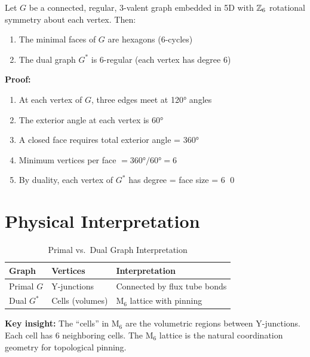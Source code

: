 \begin{derivationbox}[title=Formal Theorem (M$_6$ Coordination)]
    Let $G$ be a connected, regular, 3-valent graph embedded in 5D with $\mathbb{Z}_6$
    rotational symmetry about each vertex. Then:
    \begin{enumerate}
        \item The minimal faces of $G$ are hexagons (6-cycles)
        \item The dual graph $G^*$ is 6-regular (each vertex has degree 6)
    \end{enumerate}

    \textbf{Proof:}
    \begin{enumerate}
        \item At each vertex of $G$, three edges meet at 120° angles
        \item The exterior angle at each vertex is 60°
        \item A closed face requires total exterior angle = 360°
        \item Minimum vertices per face $= 360°/60° = 6$
        \item By duality, each vertex of $G^*$ has degree = face size = 6 \qed
    \end{enumerate}
    \tagDer
\end{derivationbox}

\section{Physical Interpretation}
\label{sec:M6:physical}

\begin{table}[htbp]
\centering
\caption{Primal vs.\ Dual Graph Interpretation}
\label{tab:M6:graphs}
\begin{tabular}{lll}
    \toprule
    Graph & Vertices & Interpretation \\
    \midrule
    Primal $G$ & Y-junctions & Connected by flux tube bonds \\
    Dual $G^*$ & Cells (volumes) & M$_6$ lattice with pinning \\
    \bottomrule
\end{tabular}
\end{table}

\textbf{Key insight:} The ``cells'' in M$_6$ are the volumetric regions between
Y-junctions. Each cell has 6 neighboring cells. The M$_6$ lattice is the
natural coordination geometry for topological pinning.

